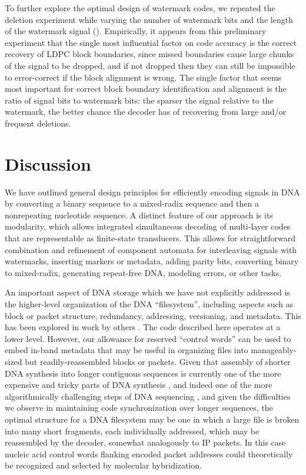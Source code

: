 \documentclass[english]{article}
\begin{document}
To further explore the optimal design of watermark codes, we repeated the deletion experiment
while varying the number of watermark bits and the length of the watermark signal ().
Empirically, it appears from this preliminary experiment that the single most influential factor on code accuracy is the
correct recovery of LDPC block boundaries, since missed boundaries cause large chunks of the signal
to be dropped, and if not dropped then they can still be impossible to error-correct if the block alignment is wrong.
The single factor that seems most important for correct block boundary identification and alignment
is the ratio of signal bits to watermark bits: the sparser the signal relative to the watermark,
the better chance the decoder has of recovering from large and/or frequent deletions.

\section{Discussion}

We have outlined general design principles for efficiently encoding signals in DNA
by converting a binary sequence to a mixed-radix sequence and then a nonrepeating nucleotide sequence.
A distinct feature of our approach is its modularity,
which allows integrated simultaneous decoding of multi-layer codes that are representable as finite-state transducers.
This allows for straightforward combination and refinement of component automata for
interleaving signals with watermarks, inserting markers or metadata, adding parity bits, converting binary to mixed-radix, generating repeat-free DNA,
modeling errors, or other tasks.

An important aspect of DNA storage which we have not explicitly addressed
is the higher-level organization of the DNA ``filesystem'',
including aspects such as block or packet structure, redundancy, addressing,
versioning, and metadata.
This has been explored in work by others \cite{YazdiEtAl2015,BornholtEtAl2016}.
The code described here operates at a lower level.
However, our allowance for reserved ``control words''
can be used to embed in-band metadata that may be useful in organizing files into manageably-sized but readily-reassembled blocks or packets.
Given that assembly of shorter DNA synthesis into longer contiguous sequences
is currently one of the more expensive and tricky parts of DNA synthesis \cite{GibsonEtAl2009},
and indeed one of the more algorithmically challenging steps of DNA sequencing \cite{PevznerEtAl2001},
and given the difficulties we observe in maintaining code synchronization over longer sequences,
the optimal structure for a DNA filesystem may be one in which a large file is broken into many short
fragments, each individually addressed, which may be reassembled by the decoder, somewhat analogously to IP packets.
In this case nucleic acid control words flanking encoded packet addresses could theoretically be recognized and selected by
molecular hybridization.
\end{document}
